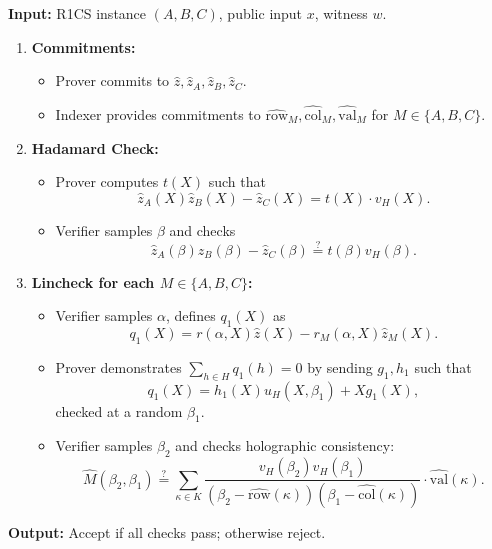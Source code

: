 \begin{protocol}

\textbf{Input:} R1CS instance $(A,B,C)$, public input $x$, witness $w$.

\begin{enumerate}
    \item \textbf{Commitments:} 
    \begin{itemize}
        \item Prover commits to $\hat z,\hat z_A,\hat z_B,\hat z_C$.
        \item Indexer provides commitments to $\widehat{\mathrm{row}}_M, \widehat{\mathrm{col}}_M, \widehat{\mathrm{val}}_M$ for $M \in \{A,B,C\}$.
    \end{itemize}
    
    \item \textbf{Hadamard Check:} 
    \begin{itemize}
        \item Prover computes $t(X)$ such that 
        \[
            \hat z_A(X)\hat z_B(X) - \hat z_C(X) = t(X)\cdot v_H(X).
        \]
        \item Verifier samples $\beta$ and checks
        \[
            \hat z_A(\beta)\hat z_B(\beta) - \hat z_C(\beta) \stackrel{?}{=} t(\beta)v_H(\beta).
        \]
    \end{itemize}
    
    \item \textbf{Lincheck for each $M \in \{A,B,C\}$:}
    \begin{itemize}
        \item Verifier samples $\alpha$, defines $q_1(X)$ as
        \[
            q_1(X) = r(\alpha,X)\hat z(X) - r_M(\alpha,X)\hat z_M(X).
        \]
        \item Prover demonstrates $\sum_{h\in H} q_1(h)=0$ by sending $g_1,h_1$ such that
        \[
            q_1(X) = h_1(X)u_H(X,\beta_1) + Xg_1(X),
        \]
        checked at a random $\beta_1$.
        \item Verifier samples $\beta_2$ and checks holographic consistency:
        \[
            \hat M(\beta_2,\beta_1) \stackrel{?}{=} 
            \sum_{\kappa\in K} \frac{v_H(\beta_2)v_H(\beta_1)}
            {(\beta_2-\widehat{\mathrm{row}}(\kappa))(\beta_1-\widehat{\mathrm{col}}(\kappa))}
            \cdot \widehat{\mathrm{val}}(\kappa).
        \]
    \end{itemize}
\end{enumerate}

\textbf{Output:} Accept if all checks pass; otherwise reject.

\end{protocol}

